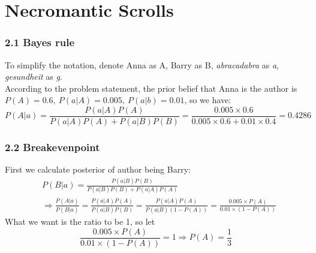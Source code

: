 \documentclass[twoside,10pt]{article}
\begin{document}
\section{Necromantic Scrolls}
\subsubsection*{2.1 Bayes rule}
To simplify the notation, denote Anna as A, Barry as B, \textit{abracadabra} as
\textit{a}, \textit{gesundheit} as \textit{g}.\\
According to the problem statement, the prior belief that Anna is the author is
$P(A) = 0.6,\ P(a|A) = 0.005,\ P(a|b) = 0.01$, so we have:
\begin{equation}
  P(A|a) = \frac{P(a|A)P(A)}{P(a|A)P(A)+P(a|B)P(B)} =
  \frac{0.005\times0.6}{0.005\times0.6+0.01\times0.4} = 0.4286 
\end{equation}
\subsubsection*{2.2 Breakevenpoint}
First we calculate posterior of author being Barry:
\begin{align}
  &P(B|a) = \frac{P(a|B)P(B)}{P(a|B)P(B) + P(a|A)P(A)}\\
  &\Rightarrow \frac{P(A|a)}{P(B|a)} = \frac{P(a|A)P(A)}{P(a|B)P(B)} =
  \frac{P(a|A)P(A)}{P(a|B)(1-P(A))} =\frac{0.005\times P(A)}{0.01\times(1-P(A))}
\end{align}
What we want is the ratio to be 1, so let
\begin{equation}
  \frac{0.005\times P(A)}{0.01\times(1-P(A))} = 1 \Rightarrow P(A) = \frac{1}{3}
\end{equation}
\end{document}

